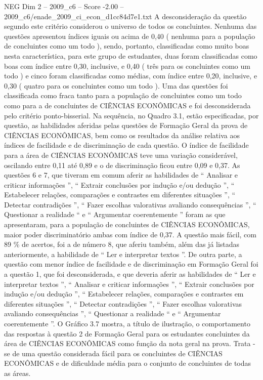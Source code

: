 \begin{textsample}{NEG Dim 2 – 2009\_c6 – Score -2.00 – 2009\_c6/enade\_2009\_ci\_econ\_d1cc84d7e1.txt}
A desconsideração da questão segundo este critério considerou o universo de todos os concluintes.
Nenhuma das questões apresentou índices iguais ou acima de 0,40 ( nenhuma para a população de concluintes como um todo ), sendo, portanto, classificadas como muito boas nesta característica, para este grupo de estudantes, duas foram classificadas como boas com índice entre 0,30, inclusive, e 0,40 ( três para os concluintes como um todo ) e cinco foram classificadas como médias, com índice entre 0,20, inclusive, e 0,30 ( quatro para os concluintes como um todo ).
Uma das questões foi classificada como fraca tanto para a população de concluintes como um todo como para a de concluintes de CIÊNCIAS ECONÔMICAS e foi desconsiderada pelo critério ponto-bisserial.
Na sequência, no Quadro 3.1, estão especificadas, por questão, as habilidades aferidas pelas questões de Formação Geral da prova de CIÊNCIAS ECONÔMICAS, bem como os resultados da análise relativa aos índices de facilidade e de discriminação de cada questão.
O índice de facilidade para a área de CIÊNCIAS ECONÔMICAS teve uma variação considerável, oscilando entre 0,11 até 0,89 e o de discriminação ficou entre 0,09 e 0,37.
As questões 6 e 7, que tiveram em comum aferir as habilidades de “ Analisar e criticar informações ”, “ Extrair conclusões por indução e/ou dedução ”, “ Estabelecer relações, comparações e contrastes em diferentes situações ”, “ Detectar contradições ”, “ Fazer escolhas valorativas avaliando consequências ”, “ Questionar a realidade “ e “ Argumentar coerentemente ” foram as que apresentaram, para a população de concluintes de CIÊNCIAS ECONÔMICAS, maior poder discriminatório ambas com índice de 0,37.
A questão mais fácil, com 89 \% de acertos, foi a de número 8, que aferiu também, além das já listadas anteriormente, a habilidade de “ Ler e interpretar textos ”.
De outra parte, a questão com menor índice de facilidade e de discriminação em Formação Geral foi a questão 1, que foi desconsiderada, e que deveria aferir as habilidades de “ Ler e interpretar textos ”, “ Analisar e criticar informações ”, “ Extrair conclusões por indução e/ou dedução ”, “ Estabelecer relações, comparações e contrastes em diferentes situações ”, “ Detectar contradições ”, “ Fazer escolhas valorativas avaliando consequências ”, “ Questionar a realidade “ e “ Argumentar coerentemente ”.
O Gráfico 3.7 mostra, a título de ilustração, o comportamento das respostas à questão 2 de Formação Geral para os estudantes concluintes da área de CIÊNCIAS ECONÔMICAS como função da nota geral na prova.
Trata -se de uma questão considerada fácil para os concluintes de CIÊNCIAS ECONÔMICAS e de dificuldade média para o conjunto de concluintes de todas as áreas.

\end{textsample}
